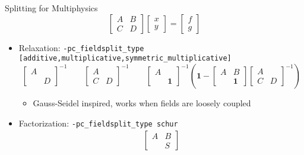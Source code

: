 \begin{frame}{Splitting for Multiphysics}
  \begin{equation*}
    \begin{bmatrix}
      A & B \\ C & D
    \end{bmatrix}
    \begin{bmatrix}
      x \\ y
    \end{bmatrix}
    =
    \begin{bmatrix}
      f \\ g
    \end{bmatrix}
  \end{equation*}
  \begin{itemize}\item Relaxation: \lstinline|-pc_fieldsplit_type| \newline
    \lstinline| [additive,multiplicative,symmetric_multiplicative]|
    \begin{equation*}
      \begin{bmatrix}
        A & \\  & D
      \end{bmatrix}^{-1} \qquad 
      \begin{bmatrix}
        A & \\ C & D
      \end{bmatrix}^{-1} \qquad
      \begin{bmatrix}
        A & \\  & \mathbf{1}
      \end{bmatrix}^{-1}
      \left(
        \mathbf{1} -
        \begin{bmatrix}
          A & B \\ & \mathbf{1}
        \end{bmatrix}
        \begin{bmatrix}
          A & \\ C & D
        \end{bmatrix}^{-1}
      \right)
    \end{equation*}
    \begin{itemize}
    \item Gauss-Seidel inspired, works when fields are loosely coupled
    \end{itemize}
  \item Factorization: \lstinline|-pc_fieldsplit_type schur|
    \begin{align*}
      \begin{bmatrix}
        A & B \\ & S

\end{bmatrix}
\end{align*}
\end{itemize}
\end{frame}
